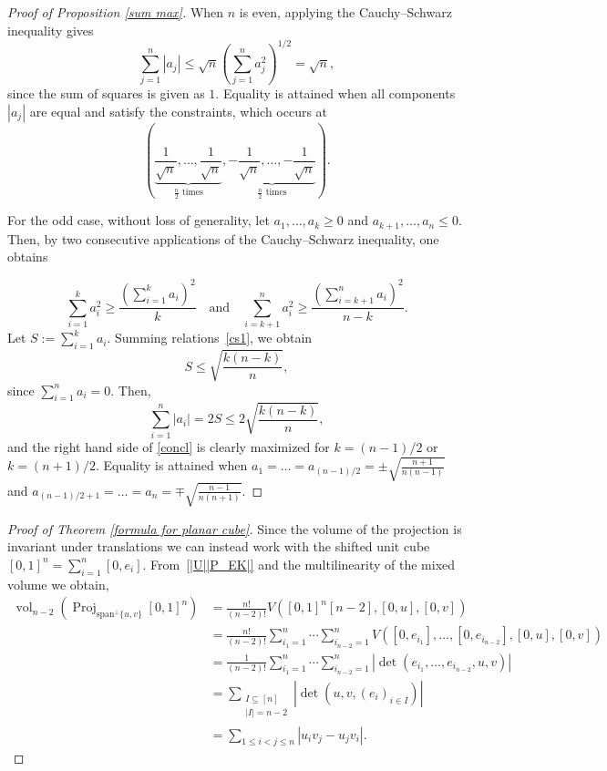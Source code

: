 \documentclass[10pt]{amsart}
\newcommand{\ls}{\leqslant}
\newcommand{\gr}{\geqslant}
\newcommand{\1}{\textbf{1}}
\numberwithin{equation}{section} %
\theoremstyle{remark}
\theoremstyle{definition}
\begin{document}
\begin{proof}[Proof of Proposition \ref{sum max}]
When $n$ is even, applying the Cauchy--Schwarz inequality gives
\[
\sum_{j=1}^{n} |a_j| \leq \sqrt{n} \left( \sum_{j=1}^{n} a_j^2 \right)^{1/2} = \sqrt{n},
\]
since the sum of squares is given as $1$. Equality is attained when all components $|a_j|$ are equal and satisfy the constraints, which occurs at
\[
\left( \underbrace{\frac{1}{\sqrt{n}}, \ldots, \frac{1}{\sqrt{n}}}_{\frac{n}{2} \text{ times}}, \underbrace{-\frac{1}{\sqrt{n}}, \ldots, -\frac{1}{\sqrt{n}}}_{\frac{n}{2} \text{ times}} \right).
\]

For the odd case, without loss of generality, let $a_1, \ldots, a_k \gr 0$ and $a_{k+1}, \ldots, a_{n} \le 0$. Then, by two consecutive applications of the Cauchy--Schwarz inequality, one obtains

\begin{equation}\label{cs1}
    \sum_{i=1}^{k}a_i^2  \gr\frac{\left(\sum_{i=1}^ka_i \right)^2}{k} \quad \text{and}\quad 
     \sum_{i=k+1}^{n}a_i^2  \gr\frac{\left(\sum_{i=k+1}^{n} a_i \right)^2}{n-k}.
\end{equation}
Let $S := \sum_{i=1}^k a_i$. Summing relations~\eqref{cs1}, we obtain
\begin{equation*}\label{cs_conc}
S \ls \sqrt{\frac{k(n-k)}{n}},
\end{equation*}
since $\sum_{i=1}^{n} a_i = 0$.
 Then, 
\begin{equation}\label{concl}
    \sum_{i=1}^{n}|a_i|= 2S\ls2 \sqrt{\frac{k(n-k)}{n}},
\end{equation}
and the right hand side of \eqref{concl} is clearly maximized for $k=(n-1)/2$ or $k=(n+1)/2$. Equality is attained when $a_1=\ldots=a_{(n-1)/2}=\pm\sqrt{\frac{n+1}{n(n-1)}}$ and $a_{(n-1)/2+1}=\ldots=a_{n}=\mp\sqrt{\frac{n-1}{n(n+1)}}$.

\end{proof}



\begin{proof}[Proof of Theorem \ref{formula for planar cube}]
Since the volume of the projection is invariant under translations we can instead work with the shifted unit cube $[0,1]^n=\sum_{i=1}^n[0,e_i]$. From~\eqref{|U||P_EK|} and the multilinearity of the mixed volume we obtain,
\begin{align*}
\operatorname{vol}_{n-2}(\operatorname{Proj}_{\text{span}^{\perp}\{u,v\}}[0,1]^n)&=\frac{n!}{(n-2)!}V\left( [0,1]^n[n-2],[0,u],[0,v]\right)\\
&=\frac{n!}{(n-2)!}\sum_{i_1=1}^n\cdots\sum_{i_{n-2}=1}^nV \left([0,e_{i_1}],\ldots,[0,e_{i_{n-2}}],[0,u],[0,v]\right)                \\
&=\frac{1}{(n-2)!}\sum_{i_1=1}^n\cdots\sum_{i_{n-2}=1}^n|\det(e_{i_1},\ldots,e_{i_{n-2}},u,v)|            \\
&=\sum_{\substack{I \subseteq [n] \\|I|=n-2}}|\det(u,v,(e_i)_{i \in I})|\\
&=\sum_{1\ls i<j\ls n}|u_iv_j-u_j v_i|.
\end{align*}
\end{proof}
\end{document}

